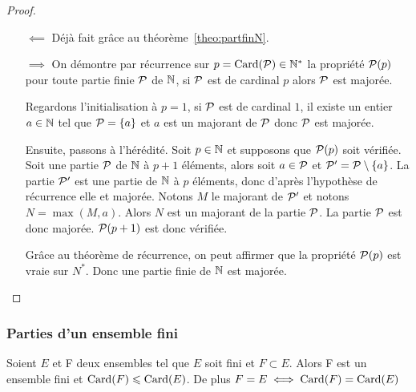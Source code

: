 \begin{proof}
  \begin{itemize}
    \item[\(\impliedby\)] Déjà fait grâce au théorème~\ref{theo:partfinN}.
    \item[\(\implies\)] On démontre par récurrence sur \(p = \Card(\P)\in 
      \N^*\) la propriété \(\P(p)\) pour toute partie finie \(\P\) de 
      \(\N\), si \(\P\) est de cardinal \(p\) alors \(\P\) est majorée. 

      Regardons l'initialisation à \(p = 1\), si \(\P\) est de cardinal 
      \(1\), il existe un entier \(a\in\N\) tel que \(\P = \{a\}\) et \(a\) 
      est un majorant de \(\P\) donc \(\P\) est majorée.

      Ensuite, passons à l'hérédité. Soit \(p \in \N\) et supposons que 
      \(\P(p)\) soit vérifiée. Soit une partie \(\P\) de \(\N\) à \(p + 1\) 
      éléments, alors soit \(a\in \P\) et \(\P' = \P\setminus\{a\}\). La 
      partie \(\P'\) est une partie de \(\N\) à \(p\) éléments, donc d'après 
      l'hypothèse de récurrence elle et majorée. Notons \(M\) le majorant de 
      \(\P'\) et notons \(N = \max(M, a)\). Alors \(N\) est un majorant de 
      la partie \(\P\). La partie \(\P\) est donc majorée. \(\P(p + 1)\) est 
      donc vérifiée.

      Grâce au théorème de récurrence, on peut affirmer que la propriété 
      \(\P(p)\) est vraie sur \(N^*\). Donc une partie finie de \(\N\) est 
      majorée.
  \end{itemize}
\end{proof}

\subsubsection{Parties d'un ensemble fini}

\begin{theo}
  \label{theo:partiesfinies}
  Soient \(E\) et F deux ensembles tel que \(E\) soit fini et \(F\subset 
  E\).  Alors F est un ensemble fini et \(\Card(F)\leqslant\Card(E)\). De 
  plus \(F = E \iff \Card(F) = \Card(E)\)
\end{theo}

